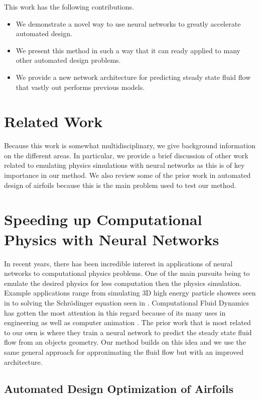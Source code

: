 \documentclass{article} %
\begin{document}
This work has the following contributions.
\begin{itemize}
  \item We demonstrate a novel way to use neural networks to greatly accelerate automated design.
  \item We present this method in such a way that it can ready applied to many other automated design problems.
  \item We provide a new network architecture for predicting steady state fluid flow that vastly out performs previous models.
\end{itemize}

\section{Related Work}

Because this work is somewhat multidisciplinary, we give background information on the different areas. In particular, we provide a brief discussion of other work related to emulating physics simulations with neural networks as this is of key importance in our method. We also review some of the prior work in automated design of airfoils because this is the main problem used to test our method.

\section{Speeding up Computational Physics with Neural Networks}

In recent years, there has been incredible interest in applications of neural networks to computational physics problems. One of the main pursuits being to emulate the desired physics for less computation then the physics simulation. Example applications range from simulating 3D high energy particle showers seen in \citep{2017arXiv170502355P} to solving the Schrödinger equation seen in \citep{mills2017deep}. Computational Fluid Dynamics has gotten the most attention in this regard because of its many uses in engineering as well as computer animation \cite{tompson2016accelerating} \cite{2017arXiv170509036H}. The prior work that is most related to our own is \citep{guo2016convolutional} where they train a neural network to predict the steady state fluid flow from an objects geometry. Our method builds on this idea and we use the same general approach for approximating the fluid flow but with an improved architecture.

\subsection{Automated Design Optimization of Airfoils}
\end{document}
